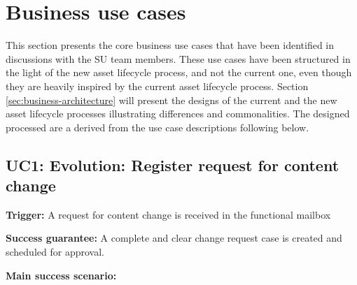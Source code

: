 \section{Business use cases}
\label{sec:business-use cases}
	
	This section presents the core business use cases that have been identified in discussions with the SU team members. These use cases have been structured in the light of the new asset lifecycle process, and not the current one, even though they are heavily inspired by the current asset lifecycle process. Section \ref{sec:business-architecture} will present the designs of the current and the new asset lifecycle processes illustrating differences and commonalities. The designed processed are a derived from the use case descriptions following below. 
	
	\subsection{UC1: Evolution: Register request for content change}
	\label{sec:uc1}
	
	\textbf{Trigger:} A request for content change is received in the functional mailbox
	
	\textbf{Success guarantee:} A complete and clear change request case is created and scheduled for approval.
	
	\textbf{Main success scenario:}
	

